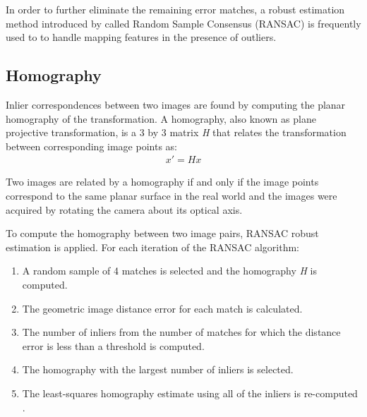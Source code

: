 \documentclass{l4proj}
\begin{document}
In order to further eliminate the remaining error matches, a robust estimation method introduced by \citet{Fischler81} called Random Sample Consensus (RANSAC) is frequently used to to handle mapping features in the presence of outliers. 


\subsection{Homography}

Inlier correspondences between two images are found by computing the planar homography of the transformation. A homography, also known as plane projective transformation, is a 3 by 3 matrix \textit{H} that relates the transformation between corresponding image points as:
\begin{align}
x'=Hx 
\end{align}

Two images are related by a homography if and only if the image points correspond to the same planar surface in the real world and the images were acquired by rotating the camera about its optical axis. 

To compute the homography between two image pairs, RANSAC robust estimation is applied. For each iteration of the RANSAC algorithm:

\begin{enumerate}
    \item A random sample of 4 matches is selected and the homography \textit{H} is computed.
    \item The geometric image distance error for each match is calculated.
    \item The number of inliers from the number of matches for which the distance error is less than a threshold is computed.
    \item The homography with the largest number of inliers is selected.
    \item The least-squares homography estimate using all of the inliers is re-computed \citep{Torr2000}.
    
\end{enumerate}

\end{document}
